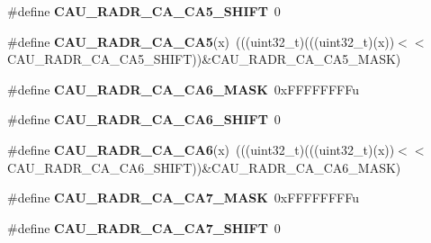 \begin{DoxyCompactItemize}
\item 
\#define {\bfseries C\+A\+U\+\_\+\+R\+A\+D\+R\+\_\+\+C\+A\+\_\+\+C\+A5\+\_\+\+S\+H\+I\+FT}~0\hypertarget{group__CAU__Register__Masks_gad8bf0b422addabdffbfde146a1d601b3}{}\label{group__CAU__Register__Masks_gad8bf0b422addabdffbfde146a1d601b3}

\item 
\#define {\bfseries C\+A\+U\+\_\+\+R\+A\+D\+R\+\_\+\+C\+A\+\_\+\+C\+A5}(x)~(((uint32\+\_\+t)(((uint32\+\_\+t)(x))$<$$<$C\+A\+U\+\_\+\+R\+A\+D\+R\+\_\+\+C\+A\+\_\+\+C\+A5\+\_\+\+S\+H\+I\+FT))\&C\+A\+U\+\_\+\+R\+A\+D\+R\+\_\+\+C\+A\+\_\+\+C\+A5\+\_\+\+M\+A\+SK)\hypertarget{group__CAU__Register__Masks_ga42ae443cab04330b104ce22a986df9d7}{}\label{group__CAU__Register__Masks_ga42ae443cab04330b104ce22a986df9d7}

\item 
\#define {\bfseries C\+A\+U\+\_\+\+R\+A\+D\+R\+\_\+\+C\+A\+\_\+\+C\+A6\+\_\+\+M\+A\+SK}~0x\+F\+F\+F\+F\+F\+F\+F\+Fu\hypertarget{group__CAU__Register__Masks_gac15bff5a590f321f7edcc30599c9e060}{}\label{group__CAU__Register__Masks_gac15bff5a590f321f7edcc30599c9e060}

\item 
\#define {\bfseries C\+A\+U\+\_\+\+R\+A\+D\+R\+\_\+\+C\+A\+\_\+\+C\+A6\+\_\+\+S\+H\+I\+FT}~0\hypertarget{group__CAU__Register__Masks_ga93c9d65769c30135083c7aeb0300184f}{}\label{group__CAU__Register__Masks_ga93c9d65769c30135083c7aeb0300184f}

\item 
\#define {\bfseries C\+A\+U\+\_\+\+R\+A\+D\+R\+\_\+\+C\+A\+\_\+\+C\+A6}(x)~(((uint32\+\_\+t)(((uint32\+\_\+t)(x))$<$$<$C\+A\+U\+\_\+\+R\+A\+D\+R\+\_\+\+C\+A\+\_\+\+C\+A6\+\_\+\+S\+H\+I\+FT))\&C\+A\+U\+\_\+\+R\+A\+D\+R\+\_\+\+C\+A\+\_\+\+C\+A6\+\_\+\+M\+A\+SK)\hypertarget{group__CAU__Register__Masks_gab6e6fbb33f9e4f51d142433e3008bafb}{}\label{group__CAU__Register__Masks_gab6e6fbb33f9e4f51d142433e3008bafb}

\item 
\#define {\bfseries C\+A\+U\+\_\+\+R\+A\+D\+R\+\_\+\+C\+A\+\_\+\+C\+A7\+\_\+\+M\+A\+SK}~0x\+F\+F\+F\+F\+F\+F\+F\+Fu\hypertarget{group__CAU__Register__Masks_gab7bd0a8a36b9bfe8642f27d09b6d24f6}{}\label{group__CAU__Register__Masks_gab7bd0a8a36b9bfe8642f27d09b6d24f6}

\item 
\#define {\bfseries C\+A\+U\+\_\+\+R\+A\+D\+R\+\_\+\+C\+A\+\_\+\+C\+A7\+\_\+\+S\+H\+I\+FT}~0\hypertarget{group__CAU__Register__Masks_ga119c6fa0ada08c282b33b5585d32983c}{}\label{group__CAU__Register__Masks_ga119c6fa0ada08c282b33b5585d32983c}


\end{DoxyCompactItemize}
